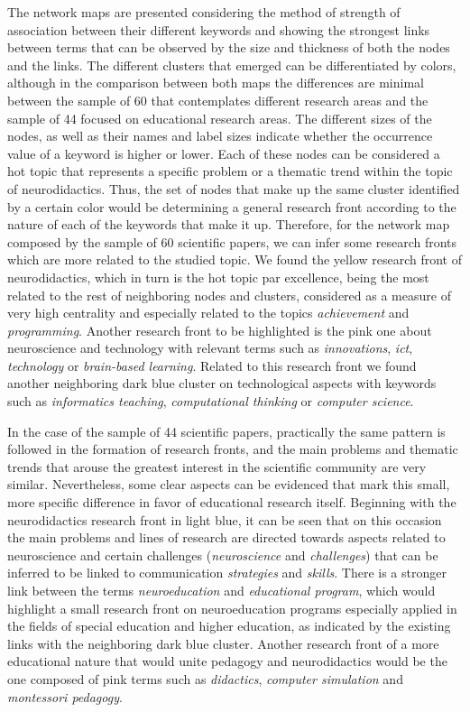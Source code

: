 \documentclass[english]{textolivre}
\begin{document}
The network maps are presented considering the method of strength of association between their different keywords and showing the strongest links between terms that can be observed by the size and thickness of both the nodes and the links. The different clusters that emerged can be differentiated by colors, although in the comparison between both maps the differences are minimal between the sample of 60 that contemplates different research areas and the sample of 44 focused on educational research areas. The different sizes of the nodes, as well as their names and label sizes indicate whether the occurrence value of a keyword is higher or lower. Each of these nodes can be considered a hot topic that represents a specific problem or a thematic trend within the topic of neurodidactics. Thus, the set of nodes that make up the same cluster identified by a certain color would be determining a general research front according to the nature of each of the keywords that make it up.  Therefore, for the network map composed by the sample of 60 scientific papers, we can infer some research fronts which are more related to the studied topic. We found the yellow research front of neurodidactics, which in turn is the hot topic par excellence, being the most related to the rest of neighboring nodes and clusters, considered as a measure of very high centrality and especially related to the topics \textit{achievement} and \textit{programming}. Another research front to be highlighted is the pink one about neuroscience and technology with relevant terms such as \textit{innovations}, \textit{ict}, \textit{technology} or \textit{brain-based learning}. Related to this research front we found another neighboring dark blue cluster on technological aspects with keywords such as \textit{informatics teaching}, \textit{computational thinking} or \textit{computer science}.

In the case of the sample of 44 scientific papers, practically the same pattern is followed in the formation of research fronts, and the main problems and thematic trends that arouse the greatest interest in the scientific community are very similar. Nevertheless, some clear aspects can be evidenced that mark this small, more specific difference in favor of educational research itself. Beginning with the neurodidactics research front in light blue, it can be seen that on this occasion the main problems and lines of research are directed towards aspects related to neuroscience and certain challenges (\textit{neuroscience} and \textit{challenges}) that can be inferred to be linked to communication \textit{strategies} and \textit{skills}. There is a stronger link between the terms \textit{neuroeducation} and \textit{educational program}, which would highlight a small research front on neuroeducation programs especially applied in the fields of special education and higher education, as indicated by the existing links with the neighboring dark blue cluster. Another research front of a more educational nature that would unite pedagogy and neurodidactics would be the one composed of pink terms such as \textit{didactics}, \textit{computer simulation} and \textit{montessori pedagogy}.
\end{document}
